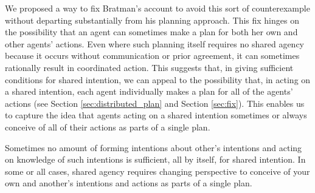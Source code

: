 \documentclass[12pt,\papersize]{extarticle}
\begin{document}
We proposed a way to fix Bratman's account to avoid this sort of counterexample without departing substantially from his planning approach.
This fix hinges on the possibility that  an agent can sometimes  make a plan for  both her own and other agents' actions.
Even where such planning itself requires no shared agency because it occurs without communication or prior agreement, 
  it can sometimes rationally result in coordinated action.
This suggests that, in giving sufficient conditions for shared intention, we can appeal to the possibility that, in acting on a shared intention, each agent individually makes a plan for all of the agents' actions (see Section \vref{sec:distributed_plan} and Section \vref{sec:fix}).
This enables us to capture the idea that agents acting on a shared intention sometimes or always conceive of all of their actions as parts of a single plan.

Sometimes no amount of forming intentions about other's intentions and acting on knowledge of such intentions is sufficient, all by itself, for shared intention.  
In some or all cases, shared agency requires changing perspective 
to conceive of your own and another's intentions and actions as parts of a single plan.



\end{document}
